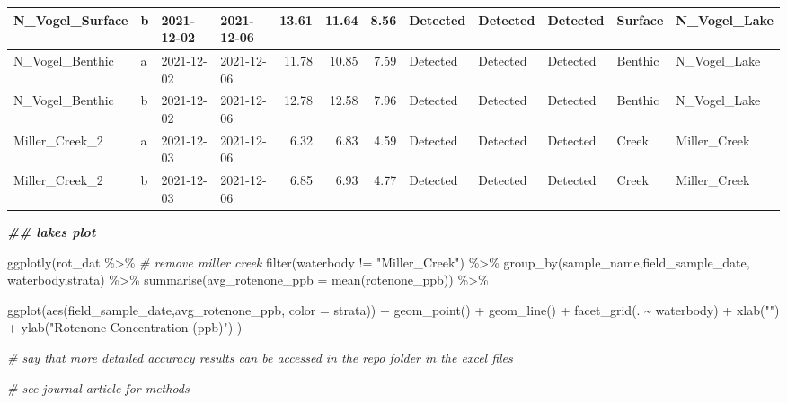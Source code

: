 \documentclass[
]{book}
\newenvironment{Shaded}{\begin{snugshade}}{\end{snugshade}}
\newcommand{\AttributeTok}[1]{\textcolor[rgb]{0.77,0.63,0.00}{#1}}
\newcommand{\CommentTok}[1]{\textcolor[rgb]{0.56,0.35,0.01}{\textit{#1}}}
\newcommand{\DocumentationTok}[1]{\textcolor[rgb]{0.56,0.35,0.01}{\textbf{\textit{#1}}}}
\newcommand{\FunctionTok}[1]{\textcolor[rgb]{0.00,0.00,0.00}{#1}}
\newcommand{\NormalTok}[1]{#1}
\newcommand{\SpecialCharTok}[1]{\textcolor[rgb]{0.00,0.00,0.00}{#1}}
\newcommand{\StringTok}[1]{\textcolor[rgb]{0.31,0.60,0.02}{#1}}
\begin{document}
\begin{table}
\begin{tabular}[t]{l|l|l|l|r|r|r|l|l|l|l|l}
\hline
N\_Vogel\_Surface & b & 2021-12-02 & 2021-12-06 & 13.61 & 11.64 & 8.56 & Detected & Detected & Detected & Surface & N\_Vogel\_Lake\\
\hline
N\_Vogel\_Benthic & a & 2021-12-02 & 2021-12-06 & 11.78 & 10.85 & 7.59 & Detected & Detected & Detected & Benthic & N\_Vogel\_Lake\\
\hline
N\_Vogel\_Benthic & b & 2021-12-02 & 2021-12-06 & 12.78 & 12.58 & 7.96 & Detected & Detected & Detected & Benthic & N\_Vogel\_Lake\\
\hline
Miller\_Creek\_2 & a & 2021-12-03 & 2021-12-06 & 6.32 & 6.83 & 4.59 & Detected & Detected & Detected & Creek & Miller\_Creek\\
\hline
Miller\_Creek\_2 & b & 2021-12-03 & 2021-12-06 & 6.85 & 6.93 & 4.77 & Detected & Detected & Detected & Creek & Miller\_Creek\\
\hline
\end{tabular}
\end{table}

\begin{Shaded}
\begin{Highlighting}[]
\DocumentationTok{\#\# lakes plot}

\FunctionTok{ggplotly}\NormalTok{(rot\_dat }\SpecialCharTok{\%\textgreater{}\%}
    \CommentTok{\# remove miller creek}
      \FunctionTok{filter}\NormalTok{(waterbody }\SpecialCharTok{!=} \StringTok{"Miller\_Creek"}\NormalTok{) }\SpecialCharTok{\%\textgreater{}\%}
    \FunctionTok{group\_by}\NormalTok{(sample\_name,field\_sample\_date, waterbody,strata) }\SpecialCharTok{\%\textgreater{}\%}
    \FunctionTok{summarise}\NormalTok{(}\AttributeTok{avg\_rotenone\_ppb =} \FunctionTok{mean}\NormalTok{(rotenone\_ppb)) }\SpecialCharTok{\%\textgreater{}\%}
  
    \FunctionTok{ggplot}\NormalTok{(}\FunctionTok{aes}\NormalTok{(field\_sample\_date,avg\_rotenone\_ppb, }\AttributeTok{color =}\NormalTok{ strata)) }\SpecialCharTok{+}
    \FunctionTok{geom\_point}\NormalTok{() }\SpecialCharTok{+}
    \FunctionTok{geom\_line}\NormalTok{() }\SpecialCharTok{+}
    \FunctionTok{facet\_grid}\NormalTok{(. }\SpecialCharTok{\textasciitilde{}}\NormalTok{ waterbody) }\SpecialCharTok{+}
      \FunctionTok{xlab}\NormalTok{(}\StringTok{""}\NormalTok{) }\SpecialCharTok{+}
      \FunctionTok{ylab}\NormalTok{(}\StringTok{"Rotenone Concentration (ppb)"}\NormalTok{)}
\NormalTok{  )}
  

\CommentTok{\# say that more detailed accuracy results can be accessed in the repo folder in the excel files}

\CommentTok{\# see journal article for methods}
\end{Highlighting}
\end{Shaded}
\end{document}
